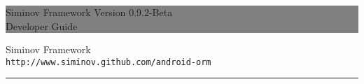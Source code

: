 \documentclass[12pt]{report}
\newcommand{\HRule}[1]{\hfill \rule{0.2\linewidth}{#1}} %
\begin{document}
\thispagestyle{empty} %


\colorbox{grey}{
	\parbox[t]{1.0\linewidth}{
		\centering \fontsize{50pt}{80pt}\selectfont %
		\vspace*{0.7cm} %
		
		\hfill Siminov Framework Version 0.9.2-Beta\\
		\hfill Developer Guide\par
		
		\vspace*{0.7cm} %
	}
}


	\vfill %


	{\centering \large 
\hfill Siminov Framework \\
\hfill \texttt{http://www.siminov.github.com/android-orm} \\

\HRule{1pt}} %


\clearpage %


\noindent
\setcounter{secnumdepth}{3}
\setcounter{tocdepth}{3}


\tableofcontents














\end{document}

